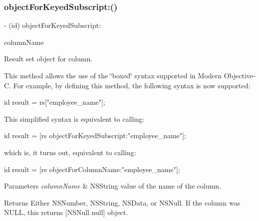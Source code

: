 \subsubsection{\texorpdfstring{object\+For\+Keyed\+Subscript\+:()}{objectForKeyedSubscript:()}}
{\footnotesize\ttfamily -\/ (id) object\+For\+Keyed\+Subscript\+: \begin{DoxyParamCaption}\item[{(N\+S\+String $\ast$)}]{column\+Name }\end{DoxyParamCaption}}

Result set object for column.

This method allows the use of the \char`\"{}boxed\char`\"{} syntax supported in Modern Objective-\/C. For example, by defining this method, the following syntax is now supported\+:

id result = rs\mbox{[}"employee\+\_\+name"\mbox{]};

This simplified syntax is equivalent to calling\+:

id result = \mbox{[}rs object\+For\+Keyed\+Subscript\+:"employee\+\_\+name"\mbox{]};

which is, it turns out, equivalent to calling\+:

id result = \mbox{[}rs object\+For\+Column\+Name\+:"employee\+\_\+name"\mbox{]};


\begin{DoxyParams}{Parameters}
{\em column\+Name} & {\ttfamily N\+S\+String} value of the name of the column.\\
\hline
\end{DoxyParams}
\begin{DoxyReturn}{Returns}
Either {\ttfamily N\+S\+Number}, {\ttfamily N\+S\+String}, {\ttfamily N\+S\+Data}, or {\ttfamily N\+S\+Null}. If the column was {\ttfamily N\+U\+LL}, this returns {\ttfamily \mbox{[}N\+S\+Null null\mbox{]}} object. 
\end{DoxyReturn}
\mbox{\label{interface_o_p_t_l_y_f_m_d_b_result_set_aa8f1fbdb3cee5f32ae5a6c133519e8fe}} 
